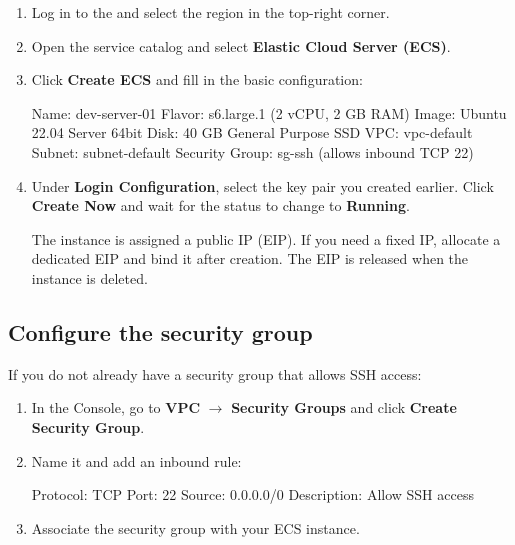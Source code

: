 \documentclass[english]{guide}
\begin{document}
\passoapasso
\begin{enumerate}
  \item Log in to the  and select the  region in the top-right
        corner.

  \item Open the service catalog and select \textbf{Elastic Cloud Server
        (ECS)}.

  \item Click \textbf{Create ECS} and fill in the basic configuration:

  \begin{codigo}
Name:           dev-server-01
Flavor:         s6.large.1 (2 vCPU, 2 GB RAM)
Image:          Ubuntu 22.04 Server 64bit
Disk:           40 GB General Purpose SSD
VPC:            vpc-default
Subnet:         subnet-default
Security Group: sg-ssh (allows inbound TCP 22)
  \end{codigo}

  \item Under \textbf{Login Configuration}, select the key pair you created
        earlier. Click \textbf{Create Now} and wait for the status to change
        to \textbf{Running}.


  \begin{aviso}
  The instance is assigned a public IP (EIP). If you need a fixed IP,
  allocate a dedicated EIP and bind it after creation. The EIP is released
  when the instance is deleted.
  \end{aviso}
\end{enumerate}

\subsection{Configure the security group}

If you do not already have a security group that allows SSH access:

\passoapasso
\begin{enumerate}
  \item In the Console, go to \textbf{VPC} $\rightarrow$ \textbf{Security
        Groups} and click \textbf{Create Security Group}.
  \item Name it  and add an inbound rule:

  \begin{codigo}
Protocol:    TCP
Port:        22
Source:      0.0.0.0/0
Description: Allow SSH access
  \end{codigo}

  \item Associate the security group with your ECS instance.
\end{enumerate}
\end{document}
